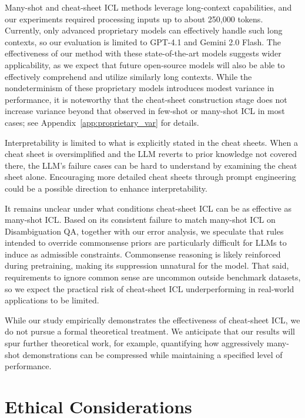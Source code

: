 \documentclass[11pt]{article}
\begin{document}
Many-shot and cheat-sheet ICL methods leverage long-context capabilities, and our experiments required processing inputs up to about 250,000 tokens.
Currently, only advanced proprietary models can effectively handle such long contexts, so our evaluation is limited to GPT-4.1 and Gemini 2.0 Flash.
The effectiveness of our method with these state-of-the-art models suggests wider applicability, as we expect that future open-source models will also be able to effectively comprehend and utilize similarly long contexts.
While the nondeterminism of these proprietary models introduces modest variance in performance, it is noteworthy that the cheat-sheet construction stage does not increase variance beyond that observed in few-shot or many-shot ICL in most cases; see Appendix~\ref{app:proprietary_var} for details.

Interpretability is limited to what is explicitly stated in the cheat sheets.
When a cheat sheet is oversimplified and the LLM reverts to prior knowledge not covered there, the LLM's failure cases can be hard to understand by examining the cheat sheet alone.
Encouraging more detailed cheat sheets through prompt engineering could be a possible direction to enhance interpretability.

It remains unclear under what conditions cheat-sheet ICL can be as effective as many-shot ICL.
Based on its consistent failure to match many-shot ICL on Disambiguation QA, together with our error analysis, we speculate that rules intended to override commonsense priors are particularly difficult for LLMs to induce as admissible constraints.
Commonsense reasoning is likely reinforced during pretraining, making its suppression unnatural for the model.
That said, requirements to ignore common sense are uncommon outside benchmark datasets, so we expect the practical risk of cheat-sheet ICL underperforming in real-world applications to be limited.

While our study empirically demonstrates the effectiveness of cheat-sheet ICL, we do not pursue a formal theoretical treatment.
We anticipate that our results will spur further theoretical work, for example, quantifying how aggressively many-shot demonstrations can be compressed while maintaining a specified level of performance.


\section*{Ethical Considerations}
\label{sec:ethical}
\end{document}
